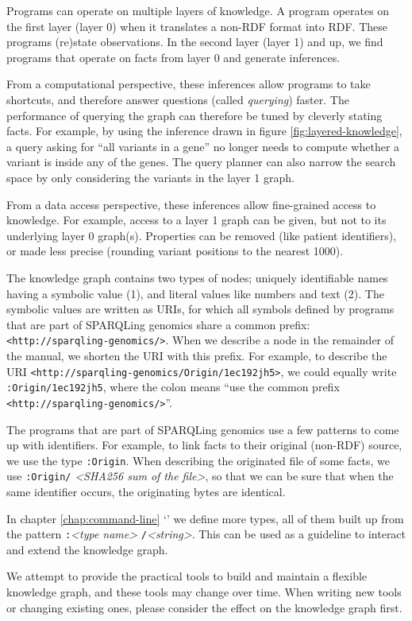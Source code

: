   Programs can operate on multiple layers of knowledge.  A program operates
  on the first layer (layer 0) when it translates a non-RDF format into RDF.
  These programs (re)state observations.  In the second layer (layer 1) and
  up, we find programs that operate on facts from layer 0 and generate
  inferences.

  From a computational perspective, these inferences allow programs to take
  shortcuts, and therefore answer questions (called \emph{querying}) faster.
  The performance of querying the graph can therefore be tuned by cleverly
  stating facts.  For example, by using the inference drawn in figure
  \ref{fig:layered-knowledge}, a query asking for ``all variants in a gene''
  no longer needs to compute whether a variant is inside any of the
  genes.  The query planner can also narrow the search space by only
  considering the variants in the layer 1 graph.

  From a data access perspective, these inferences allow fine-grained access
  to knowledge.  For example, access to a layer 1 graph can be given, but
  not to its underlying layer 0 graph(s).  Properties can be removed (like
  patient identifiers), or made less precise (rounding variant positions to
  the nearest 1000).

  \begin{sloppypar}
  The knowledge graph contains two types of nodes; uniquely identifiable
  names having a symbolic value (1), and literal values like numbers and
  text (2).  The symbolic values are written as URIs, for which all symbols
  defined by programs that are part of SPARQLing genomics share a common
  prefix: \texttt{<http://sparqling-genomics/>}.  When we describe a node
  in the remainder of the manual, we shorten the URI with this prefix.
  For example, to describe the URI
  \texttt{<http://sparqling-genomics/Origin/1ec192jh5>}, we could equally
  write \texttt{:Origin/1ec192jh5}, where the colon means ``use the
  common prefix \texttt{<http://sparqling-genomics/>}''.
  \end{sloppypar}

  The programs that are part of SPARQLing genomics use a few patterns to
  come up with identifiers.  For example, to link facts to their original
  (non-RDF) source, we use the type \texttt{:Origin}.  When describing the
  originated file of some facts, we use \texttt{:Origin/}%
  \emph{<SHA256 sum of the file>}, so that we can be sure that when the
  same identifier occurs, the originating bytes are identical.

  In chapter \ref{chap:command-line}
  {\color{LinkGray}`'} we define more types,
  all of them built up from the pattern \texttt{:}\emph{<type name>}%
  \texttt{/}\emph{<string>}.  This can be used as a guideline to interact
  and extend the knowledge graph.

  We attempt to provide the practical tools to build and maintain a flexible
  knowledge graph, and these tools may change over time.  When writing new
  tools or changing existing ones, please consider the effect on the knowledge
  graph first.
